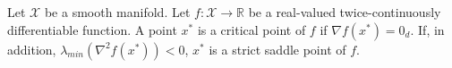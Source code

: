 \documentclass[journal]{IEEEtran}
\newtheorem{definition}{Definition}[section]
\begin{document}
\par Let $\mathcal{X}$ be a smooth manifold. Let $f:\mathcal{X} \to \mathbb{R}$ be a real-valued twice-continuously differentiable function. A point $x^*$ is a critical point of $f$ if $\nabla f(x^*)=0_d$. If, in addition, $\lambda_{min}(\nabla^2 f(x^*))<0$, $x^*$ is a strict saddle point of $f$. 
\end{document}

